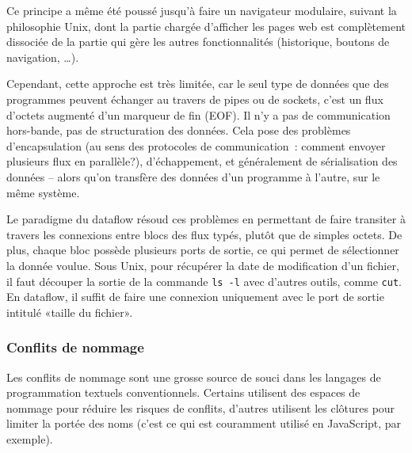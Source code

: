 \documentclass{article}
\begin{document}
Ce principe a même été poussé jusqu'à faire un navigateur modulaire, suivant la philosophie Unix, dont la partie chargée d'afficher les
pages web est complètement dissociée de la partie qui gère les autres fonctionnalités (historique, boutons de navigation, \dots).

Cependant, cette approche est très limitée, car le seul type de données que des programmes peuvent échanger au travers de pipes ou de
sockets, c'est un flux d'octets augmenté d'un marqueur de fin (EOF). Il n'y a pas de communication hors-bande, pas de structuration des
données. Cela pose des problèmes d'encapsulation (au sens des protocoles de communication~: comment envoyer plusieurs flux en parallèle?),
d'échappement, et généralement de sérialisation des données -- alors qu'on transfère des données d'un programme à l'autre, sur le même
système.

Le paradigme du dataflow résoud ces problèmes en permettant de faire transiter à travers les connexions entre blocs des flux typés, plutôt
que de simples octets. De plus, chaque bloc possède plusieurs ports de sortie, ce qui permet de sélectionner la donnée voulue. Sous Unix,
pour récupérer la date de modification d'un fichier, il faut découper la sortie de la commande \texttt{ls -l} avec d'autres outils, comme
\texttt{cut}. En dataflow, il suffit de faire une connexion uniquement avec le port de sortie intitulé «taille du fichier».



\subsubsection{Conflits de nommage}
Les conflits de nommage sont une grosse source de souci dans les langages de programmation textuels conventionnels. Certains utilisent des
espaces de nommage pour réduire les risques de conflits, d'autres utilisent les clôtures pour limiter la portée des noms (c'est ce qui est
couramment utilisé en JavaScript, par exemple).
\end{document}
